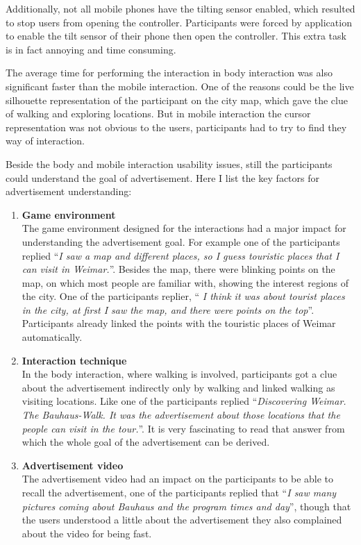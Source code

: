 Additionally, not all mobile phones have the tilting sensor enabled, which resulted to stop users from opening the controller. Participants were forced by application to enable the tilt sensor of their phone then open the controller. This extra task is in fact annoying and time consuming. 

The average time for performing the interaction in body interaction was also significant faster than the mobile interaction. One of the reasons could be the live silhouette representation of the participant on the city map, which gave the clue of walking and exploring locations. But in mobile interaction the cursor representation was not obvious to the users, participants had to try to find they way of interaction.  

Beside the body and mobile interaction usability issues, still the participants could understand the goal of advertisement. Here I list the key factors for advertisement understanding:
\begin{enumerate}
\item   \textbf{Game environment} \\
The game environment designed for the interactions had a major impact for understanding the advertisement goal. For example one of the participants replied ``\emph{I saw a map and different places, so I guess touristic places that I can visit in Weimar.}''. Besides the map, there were blinking points on the map, on which most people are familiar with, showing the interest regions of the city. One of the participants replier,  ``\emph{ I think it was about tourist places in the city, at first I saw the map, and there were points on the top}''. Participants already linked the points with the touristic places of Weimar automatically. 

\item   \textbf{Interaction technique} \\
In the body interaction, where walking is involved, participants got a clue about the advertisement indirectly only by walking and linked walking as visiting locations. Like one of the participants replied ``\emph{Discovering Weimar. The Bauhaus-Walk. It was the advertisement about those locations that the people can visit in the tour.}''. It is very fascinating to read that answer from which the whole goal of the advertisement can be derived.

\item   \textbf{Advertisement video} \\
The advertisement video had an impact on the participants to be able to recall the advertisement, one of the participants replied that ``\emph{I saw many pictures coming about Bauhaus and the program times and day}'', though that the users understood a little about the advertisement they also complained about the video for being fast.
\end{enumerate}


